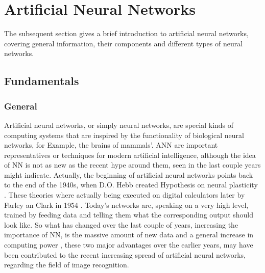\chapter{Artificial Neural Networks}\label{chapter:Artificial Neural Networks}
The subsequent section gives a brief introduction to artificial neural networks, covering general information, their components and different types of neural networks.

\section{Fundamentals}
\subsection{General}
Artificial neural networks, or simply neural networks, are special kinds of computing systems that are inspired by the functionality of biological neural networks, for Example, the brains of mammals'. ANN are important representatives or techniques for modern artificial intelligence, although the idea of NN is not as new as the recent hype around them, seen in the last couple years might indicate. Actually, the beginning of artificial neural networks points back to the end of the 1940s, when D.O. Hebb created Hypothesis on neural plasticity \cite{hebb}. These theories where actually being executed on digital calculators later by Farley an Clark in 1954 \cite{farleyclark}. Today's networks are, speaking on a very high level,  trained by feeding data and telling them what the corresponding output should look like. \newline
So what has changed over the last couple of years, increasing the importance of NN, is the massive amount of new data and a general increase in computing power \cite{moore}, these two major advantages over the earlier years, may have been contributed to the recent increasing spread of artificial neural networks, regarding the field of image recognition.
\newpage
